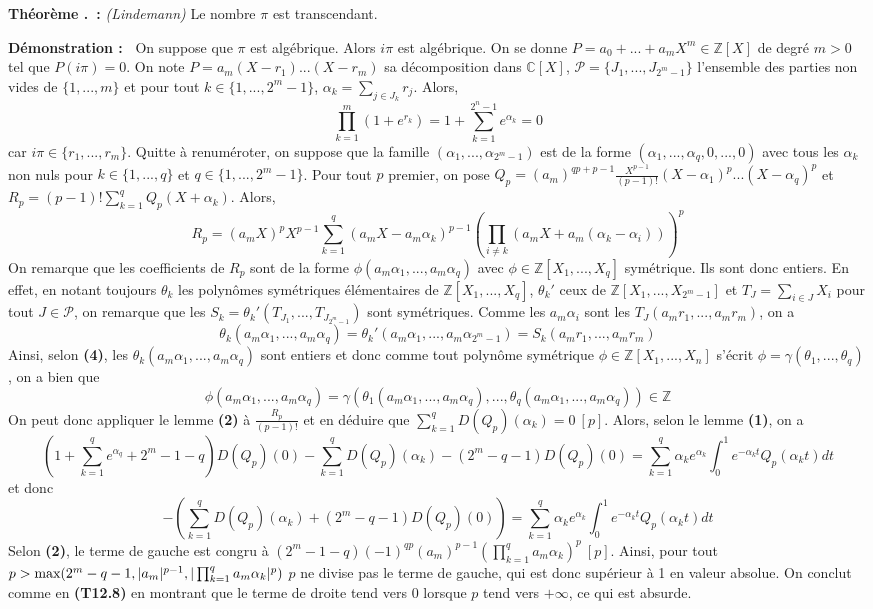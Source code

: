 \documentclass[5pt,a4paper]{article}
\newcounter{thmcounter}[subsection]
\renewcommand{\thethmcounter}{\thesubsection.\arabic{thmcounter}}
\newcommand{\thm}[1]{
    \stepcounter{thmcounter}
    \hypertarget{t:\thethmcounter}{}%
    \noindent\textbf{Théorème \thethmcounter ~:} #1 \newline
}
\newcommand{\demo}[1]{
    \textbf{Démonstration :~} #1 \newline
}
\begin{document}
\begin{onehalfspacing}
\thm{\textit{(Lindemann)} Le nombre $\pi$ est transcendant.}
\demo{On suppose que $\pi$ est algébrique. Alors $i\pi$ est algébrique. On se donne $P = a_0 + ... + a_mX^m \in \mathbb{Z}[X]$ de degré $m > 0$ tel que $P(i\pi) = 0$. On note $P = a_m(X - r_1)...(X - r_m)$ sa décomposition dans $\mathbb{C}[X]$, $\mathcal{P} = \{J_1, ..., J_{2^m - 1}\}$ l'ensemble des parties non vides de $\{1, ..., m\}$ et pour tout $k \in \{1, ..., 2^m - 1\}$, $\alpha_k = \sum_{j \in J_k} r_j$. Alors, 
\[\prod_{k=1}^m (1 + e^{r_k}) = 1 + \sum_{k = 1}^{2^n - 1} e^{\alpha_k} = 0\] car $i\pi \in \{r_1, ..., r_m\}$. Quitte à renuméroter, on suppose que la famille $(\alpha_1, ..., \alpha_{2^m - 1})$ est de la forme $(\alpha_1, ..., \alpha_q, 0, ..., 0)$ avec tous les $\alpha_k$ non nuls pour $k \in \{1, ..., q\}$ et $q \in \{1, ..., 2^m - 1\}$. Pour tout $p$ premier, on pose $Q_p = (a_m)^{qp + p - 1}\frac{X^{p-1}}{(p-1)!}(X - \alpha_1)^p...(X-\alpha_q)^p$ et $R_p = (p-1)!\sum_{k=1}^q Q_p(X + \alpha_k)$. Alors, 
\[R_p = (a_mX)^pX^{p-1} \sum_{k=1}^q (a_mX - a_m\alpha_k)^{p-1}(\prod_{i \neq k} (a_mX + a_m(\alpha_k - \alpha_i)))^p\]
On remarque que les coefficients de $R_p$ sont de la forme $\phi(a_m\alpha_1, ..., a_m\alpha_q)$ avec $\phi \in \mathbb{Z}[X_1, ..., X_q]$ symétrique. Ils sont donc entiers. En effet, en notant toujours $\theta_k$ les polynômes symétriques élémentaires de $\mathbb{Z}[X_1, ..., X_q]$, $\theta_k'$ ceux de $\mathbb{Z}[X_1, ..., X_{2^m - 1}]$ et $T_J = \sum_{i \in J} X_i$ pour tout $J \in \mathcal{P}$, on remarque que les $S_k = \theta_k'(T_{J_1}, ..., T_{J_{2^m - 1}})$ sont symétriques. Comme les $a_m\alpha_i$ sont les $T_J(a_mr_1, ..., a_mr_m)$, on a 
\[ \theta_k(a_m\alpha_1, ..., a_m\alpha_q) = \theta_k'(a_m\alpha_1, ..., a_m\alpha_{2^m-1}) = S_k(a_mr_1, ..., a_mr_m)\]
Ainsi, selon \textbf{(4)}, les $\theta_k(a_m\alpha_1, ..., a_m\alpha_q)$ sont entiers et donc comme tout polynôme symétrique $\phi \in \mathbb{Z}[X_1, ..., X_n]$ s'écrit $\phi = \gamma(\theta_1, ..., \theta_q)$, on a bien que 
\[ \phi(a_m\alpha_1, ..., a_m\alpha_q) = \gamma(\theta_1(a_m\alpha_1, ..., a_m\alpha_q), ..., \theta_q(a_m\alpha_1, ..., a_m\alpha_q)) \in \mathbb{Z}\]
On peut donc appliquer le lemme \textbf{(2)} à $\frac{R_p}{(p-1)!}$ et en déduire que $\sum_{k=1}^q D(Q_p)(\alpha_k) = 0~[p]$. Alors, selon le lemme \textbf{(1)}, on a
\[ (1 + \sum_{k=1}^q e^{\alpha_q} + 2^m - 1 - q)D(Q_p)(0) - \sum_{k=1}^q D(Q_p)(\alpha_k) - (2^m - q - 1)D(Q_p)(0) = \sum_{k=1}^q \alpha_ke^{\alpha_k} \int_0^1 e^{-\alpha_kt}Q_p(\alpha_kt)dt\]
et donc 
\[ -(\sum_{k=1}^q D(Q_p)(\alpha_k) + (2^m - q - 1)D(Q_p)(0)) = \sum_{k=1}^q \alpha_ke^{\alpha_k} \int_0^1 e^{-\alpha_kt}Q_p(\alpha_kt)dt\]
Selon \textbf{(2)}, le terme de gauche est congru à $(2^m - 1 - q)(-1)^{qp}(a_m)^{p-1}(\prod_{k=1}^q a_m\alpha_k)^p~[p]$. Ainsi, pour tout $p > \textup{max}(2^m - q - 1, |a_m|^{p-1}, |\prod_{k=1}^q a_m\alpha_k|^p)$ $p$ ne divise pas le terme de gauche, qui est donc supérieur à 1 en valeur absolue. On conclut comme en \textbf{(T12.8)} en montrant que le terme de droite tend vers 0 lorsque $p$ tend vers $+\infty$, ce qui est absurde.}


\end{onehalfspacing}
\end{document}
